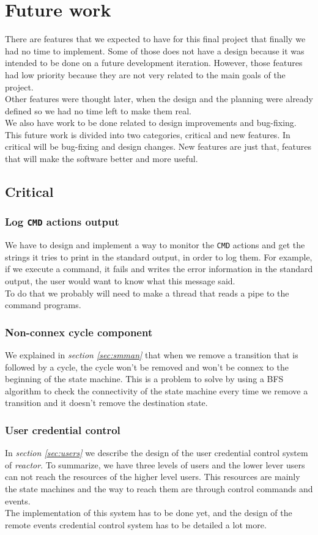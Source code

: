 \section{Future work}
\label{sec:future}
There are features that we expected to have for this final project that finally we had no time to implement. Some of those does not
have a design because it was intended to be done on a future development iteration. However, those features had low priority because
they are not very related to the main goals of the project.\\
Other features were thought later, when the design and the planning were already defined so we had no time left to make them real.\\
We also have work to be done related to design improvements and bug-fixing.\\
This future work is divided into two categories, critical and new features. In critical will be bug-fixing and design changes. New features
are just that, features that will make the software better and more useful.
\subsection{Critical}
\subsubsection{Log \texttt{CMD} actions output}
We have to design and implement a way to monitor the \texttt{CMD} actions and get the strings it tries to print in the standard output, in
order to log them. For example, if we execute a command, it fails and writes the error information in the standard output, the user would
want to know what this message said.\\
To do that we probably will need to make a thread that reads a pipe to the command programs.
\subsubsection{Non-connex cycle component}
We explained in \emph{section \ref{sec:smman}} that when we remove a transition that is followed by a cycle, the cycle won't be removed and
won't be connex to the beginning of the state machine. This is a problem to solve by using a BFS algorithm to check the connectivity of the
state machine every time we remove a transition and it doesn't remove the destination state.
\subsubsection{User credential control}
In \emph{section \ref{sec:users}} we describe the design of the user credential control system of \emph{reactor}. To summarize, we have
three levels of users and the lower lever users can not reach the resources of the higher level users. This resources are mainly the state 
machines and the way to reach them are through control commands and events.\\
The implementation of this system has to be done yet, and the design of the remote events credential control system has to be detailed a
lot more.

